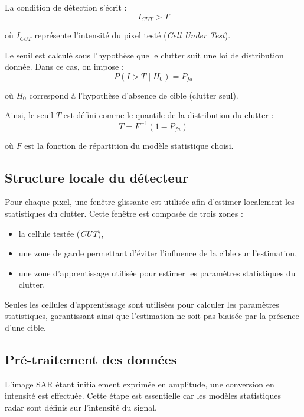 La condition de détection s’écrit :
\begin{equation}
    I_{CUT} > T
\end{equation}

où $I_{CUT}$ représente l’intensité du pixel testé (\textit{Cell Under Test}).

Le seuil est calculé sous l’hypothèse que le clutter suit une loi de distribution donnée. Dans ce cas, on impose :
\begin{equation}
    P(I > T \mid H_0) = P_{fa}
\end{equation}

où $H_0$ correspond à l’hypothèse d’absence de cible (clutter seul).

Ainsi, le seuil $T$ est défini comme le quantile de la distribution du clutter :
\begin{equation}
    T = F^{-1}(1 - P_{fa})
\end{equation}

où $F$ est la fonction de répartition du modèle statistique choisi.

\subsection{Structure locale du détecteur}

Pour chaque pixel, une fenêtre glissante est utilisée afin d’estimer localement les statistiques du clutter. Cette fenêtre est composée de trois zones :

\begin{itemize}
    \item la cellule testée (\textit{CUT}),
    \item une zone de garde permettant d’éviter l’influence de la cible sur l’estimation,
    \item une zone d’apprentissage utilisée pour estimer les paramètres statistiques du clutter.
\end{itemize}

Seules les cellules d’apprentissage sont utilisées pour calculer les paramètres statistiques, garantissant ainsi que l’estimation ne soit pas biaisée par la présence d’une cible.

\subsection{Pré-traitement des données}

L’image SAR étant initialement exprimée en amplitude, une conversion en intensité est effectuée. Cette étape est essentielle car les modèles statistiques radar sont définis sur l’intensité du signal.

